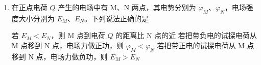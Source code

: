 \documentclass[\gkver]{gaokaozhenti}
\begin{document}
\begin{enumerate}
{故 A 错误；

B．火星和地球绕太阳匀速圆周运动，速度大小均不变，当火星与地球相距最远时，由于两者的速度方向相反，故此时两者相对速度最大，故 B 正确；

C．在星球表面根据万有引力定律有 $G\frac{Mm}{r^{2}}=mg$

由于不知道火星和地球的质量比，故无法得出火星和地球表面的自由落体加速度，故 C 错误；

D．火星和地球绕太阳匀速圆周运动，有 $\omega_{\text{火}} = \frac{2\pi}{T_{\text{火}}}$，$\omega_{\text{地}} = \frac{2\pi}{T_{\text{地}}}$

要发生下一次火星冲日则有 $\left(\frac{2\pi}{T_{\text{地}}} - \frac{2\pi}{T_{\text{火}}}\right)t = 2\pi$

得 $t = \frac{T_{\text{火}}T_{\text{地}}}{T_{\text{火}} - T_{\text{地}}} > T_{\text{地}}$

可知下一次“火星冲日”将出现在 2023 年 12 月 8 日之后，故 D 错误。

故选 B。
}

\item
在正点电荷 $Q$ 产生的电场中有 M、N 两点，其电势分别为 $\varphi_{M}$、$\varphi_{N}$，电场强度大小分别为 $E_{M}$、$E_{N}$。下列说法正确的是 

{若 $E_{M} < E_{N}$，则 M 点到电荷 $Q$ 的距离比 N 点的近}
{若把带负电的试探电荷从 M 点移到 N 点，电场力做正功，则 $\varphi_{M} < \varphi_{N}$}
{若把带正电的试探电荷从 M 点移到 N 点，电场力做负功，则 $E_{M} > E_{N}$}



\end{enumerate}
\end{document}
